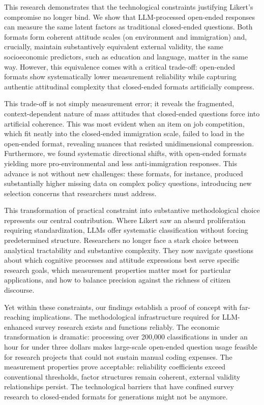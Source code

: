 \documentclass[
  journal=ram,
  manuscript=article-type,
  year=2025,
  volume=unpublished,
]{cup-journal}
\begin{document}
This research demonstrates that the technological constraints justifying Likert’s compromise no longer bind. We show that LLM-processed open-ended responses can measure the same latent factors as traditional closed-ended questions. Both formats form coherent attitude scales (on environment and immigration) and, crucially, maintain substantively equivalent external validity, the same socioeconomic predictors, such as education and language, matter in the same way. However, this equivalence comes with a critical trade-off: open-ended formats show systematically lower measurement reliability while capturing authentic attitudinal complexity that closed-ended formats artificially compress.

This trade-off is not simply measurement error; it reveals the fragmented, context-dependent nature of mass attitudes that closed-ended questions force into artificial coherence. This was most evident when an item on job competition, which fit neatly into the closed-ended immigration scale, failed to load in the open-ended format, revealing nuances that resisted unidimensional compression. Furthermore, we found systematic directional shifts, with open-ended formats yielding more pro-environmental and less anti-immigration responses. This advance is not without new challenges: these formats, for instance, produced substantially higher missing data on complex policy questions, introducing new selection concerns that researchers must address.

This transformation of practical constraint into substantive methodological choice represents our central contribution. Where Likert saw an absurd proliferation requiring standardization, LLMs offer systematic classification without forcing predetermined structure. Researchers no longer face a stark choice between analytical tractability and substantive complexity. They now navigate questions about which cognitive processes and attitude expressions best serve specific research goals, which measurement properties matter most for particular applications, and how to balance precision against the richness of citizen discourse.

Yet within these constraints, our findings establish a proof of concept with far-reaching implications.
The methodological infrastructure required for LLM-enhanced survey research exists and functions reliably.
The economic transformation is dramatic: processing over 200,000 classifications in under an hour for under three dollars makes large-scale open-ended question usage feasible for research projects that could not sustain manual coding expenses.
The measurement properties prove acceptable: reliability coefficients exceed conventional thresholds, factor structures remain coherent, external validity relationships persist.
The technological barriers that have confined survey research to closed-ended formats for generations might not be anymore.
\end{document}
